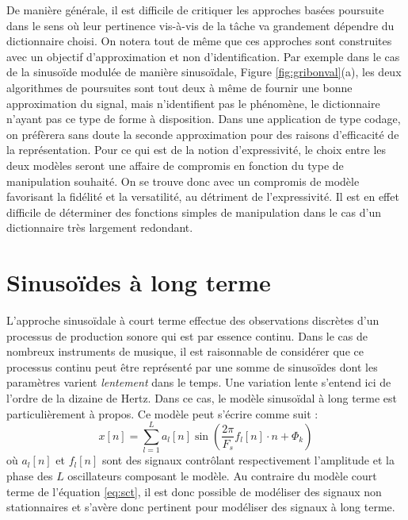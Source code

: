 De manière générale, il est difficile de critiquer les approches basées poursuite dans le sens où leur pertinence vis-à-vis de la tâche va grandement dépendre du dictionnaire choisi. On notera tout de même que ces approches sont construites avec un objectif d'approximation et non d'identification. Par exemple dans le cas de la sinusoïde modulée de manière sinusoïdale, Figure \ref{fig:gribonval}(a), les deux algorithmes de poursuites sont tout deux à même de fournir une bonne approximation du signal, mais \og n'identifient \fg pas le phénomène, le dictionnaire n'ayant pas ce type de forme à disposition. Dans une application de type codage, on préfèrera sans doute la seconde approximation pour des raisons d'efficacité de la représentation. Pour ce qui est de la notion d'expressivité, le choix entre les deux modèles seront une affaire de compromis en fonction du type de manipulation souhaité. On se trouve donc avec un compromis de modèle favorisant la fidélité et la versatilité, au détriment de l'expressivité. Il est en effet difficile de déterminer des fonctions simples de manipulation dans le cas d'un dictionnaire très largement redondant.


\section{ \nmu Sinusoïdes à long terme}  \label{sec:slt}

L'approche sinusoïdale à court terme effectue des observations discrètes d'un processus de production sonore qui est par essence continu. Dans le cas de nombreux instruments de musique, il est raisonnable de considérer que ce processus continu peut être représenté par une somme de sinusoïdes dont les paramètres varient \textsl{lentement} dans le temps. Une variation lente s'entend ici de l'ordre de la dizaine de Hertz. Dans ce cas, le modèle sinusoïdal à long terme est particulièrement à propos. Ce modèle peut s'écrire comme suit :
\begin{equation}
x[n]=\sum_{l=1}^{L} a_{l}[n] \sin \left(\frac{2 \pi}{F_{s}} f_{l}[n] \cdot n + \Phi_k \right)
\label{eq:slt}
\end{equation}
où $a_{l}[n]$ et $f_{l}[n]$ sont des signaux contrôlant respectivement l'amplitude et la phase des $L$ oscillateurs composant le modèle. Au contraire du modèle court terme de l'équation \ref{eq:sct}, il est donc possible de modéliser des signaux non stationnaires et s'avère donc pertinent pour modéliser des signaux à long terme.

